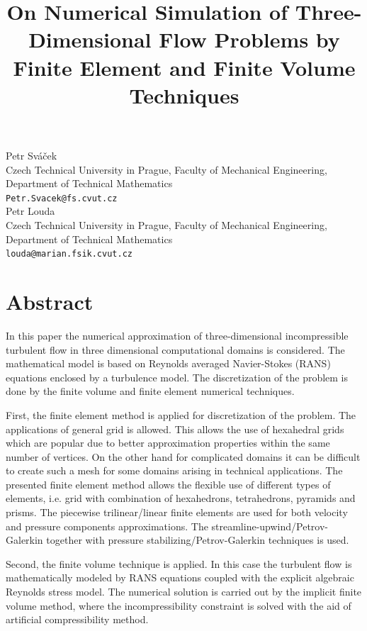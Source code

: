 \documentclass[article,A4,11pt]{llncs}%
\begin{document}
\title{On Numerical Simulation of Three-Dimensional Flow Problems by Finite Element and Finite Volume Techniques}
 \author{} \institute{}
\maketitle
\begin{center}
{\large Petr Sváček}\\
Czech Technical University in Prague, Faculty of Mechanical Engineering, Department of Technical Mathematics\\
{\tt Petr.Svacek@fs.cvut.cz}
\\ \vspace{4mm}
{\large Petr Louda}\\
Czech Technical University in Prague, Faculty of Mechanical Engineering, Department of Technical Mathematics\\
{\tt louda@marian.fsik.cvut.cz}
\end{center}

\section*{Abstract}
In this paper the numerical approximation of three-dimensional incompressible turbulent flow 
in three dimensional computational domains is considered.
The mathematical model is based on Reynolds averaged Navier-Stokes (RANS) equations enclosed by a turbulence model.
The discretization of the problem is done by the finite volume and finite element numerical techniques.


First, the finite element method is applied for discretization of the problem.
The applications of general grid is allowed. This allows the use of hexahedral grids 
which are popular due to better approximation properties  within the same number of vertices.
On the other hand for complicated domains it can be difficult to create such a mesh for some domains arising in technical applications.
The presented finite element method allows the flexible use of different types of elements,
i.e. grid with combination of hexahedrons, tetrahedrons, pyramids and prisms.
The piecewise trilinear/linear finite elements are used for both velocity and pressure components approximations.
The streamline-upwind/Petrov-Galerkin together with pressure stabilizing/Petrov-Galerkin techniques is used.



Second, the finite volume technique is applied. In this case the turbulent flow is  mathematically modeled by RANS equations
coupled with the explicit algebraic Reynolds stress model. The numerical solution is carried out by the implicit finite volume method,
where the incompressibility constraint is solved with the aid of artificial compressibility method.
\end{document}
